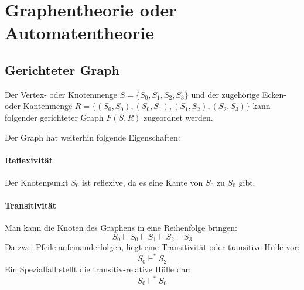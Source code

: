 \documentclass[../main.tex]{subfiles}
\begin{document}
    \section[Automatentheorie]{Graphentheorie oder Automatentheorie}
        \subsection{Gerichteter Graph}
            Der Vertex- oder Knotenmenge $S = \{S_0, S_1, S_2, S_3\}$ und der zugehörige Ecken- oder Kantenmenge $R = \{\left(S_0, S_0\right), \left(S_0, S_1\right), \left(S_1, S_2\right), \left(S_2, S_3\right)\}$ kann folgender gerichteter Graph $F\left(S, R\right)$ zugeordnet werden.
            
            \begin{center}
            \end{center}
            
            Der Graph hat weiterhin folgende Eigenschaften:
            
            \paragraph{Reflexivität}
                Der Knotenpunkt $S_0$ ist reflexive, da es eine Kante von $S_0$ zu $S_0$ gibt.
                
            \paragraph{Transitivität}
                Man kann die Knoten des Graphens in eine Reihenfolge bringen:
                \begin{equation}
                    S_0 \vdash S_0 \vdash S_1 \vdash S_2 \vdash S_3
                \end{equation}
                Da zwei Pfeile aufeinanderfolgen, liegt eine Transitivität oder transitive Hülle vor:
                \begin{equation}
                    S_0 \vdash^* S_2
                \end{equation}
                Ein Spezialfall stellt die transitiv-relative Hülle dar:
                \begin{equation}
                    S_0 \vdash^* S_0
                \end{equation}
                
\end{document}
